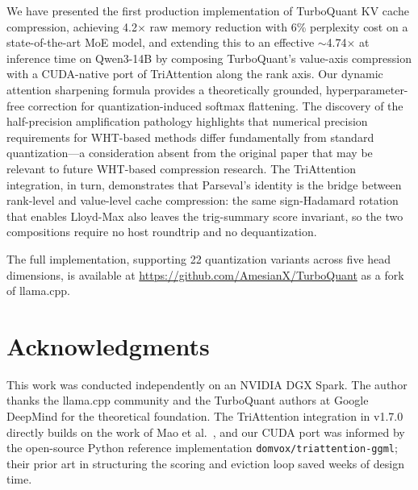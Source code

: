 \documentclass[10pt,twocolumn]{article}
\begin{document}
We have presented the first production implementation of TurboQuant KV cache compression, achieving 4.2$\times$ raw memory reduction with 6\% perplexity cost on a state-of-the-art MoE model, and extending this to an effective $\sim$4.74$\times$ at inference time on Qwen3-14B by composing TurboQuant's value-axis compression with a CUDA-native port of TriAttention along the rank axis. Our dynamic attention sharpening formula provides a theoretically grounded, hyperparameter-free correction for quantization-induced softmax flattening. The discovery of the half-precision amplification pathology highlights that numerical precision requirements for WHT-based methods differ fundamentally from standard quantization---a consideration absent from the original paper that may be relevant to future WHT-based compression research. The TriAttention integration, in turn, demonstrates that Parseval's identity is the bridge between rank-level and value-level cache compression: the same sign-Hadamard rotation that enables Lloyd-Max also leaves the trig-summary score invariant, so the two compositions require no host roundtrip and no dequantization.

The full implementation, supporting 22 quantization variants across five head dimensions, is available at \url{https://github.com/AmesianX/TurboQuant} as a fork of llama.cpp.

\section*{Acknowledgments}

This work was conducted independently on an NVIDIA DGX Spark. The author thanks the llama.cpp community and the TurboQuant authors at Google DeepMind for the theoretical foundation. The TriAttention integration in v1.7.0 directly builds on the work of Mao et al.~\cite{triattention2026}, and our CUDA port was informed by the open-source Python reference implementation \texttt{domvox/triattention-ggml}; their prior art in structuring the scoring and eviction loop saved weeks of design time.
\end{document}
